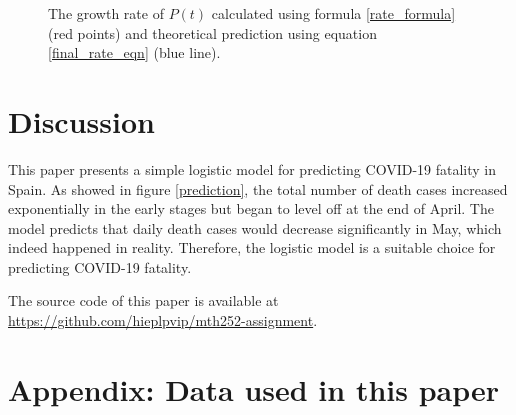 \documentclass[12pt]{scrartcl}
\begin{document}
\begin{figure}[H]
  \centering
  
  \caption{The growth rate of $P(t)$ calculated using formula \ref{rate_formula} (red points)
  and theoretical prediction using equation \ref{final_rate_eqn} (blue line).}
\end{figure}

\section*{Discussion}

This paper presents a simple logistic model for predicting COVID-19 fatality in Spain.
As showed in figure \ref{prediction}, the total number of death cases increased
exponentially in the early stages but began to level off at the end of April.
The model predicts that daily death cases would decrease significantly in May,
which indeed happened in reality. Therefore, the logistic model is a suitable
choice for predicting COVID-19 fatality.

The source code of this paper is available at
\url{https://github.com/hieplpvip/mth252-assignment}.

\printbibliography

\newpage

\appendix
\section*{Appendix: Data used in this paper}


\end{document}

